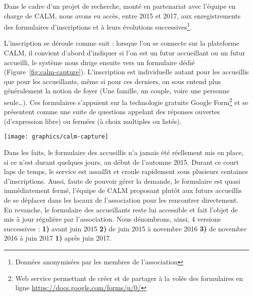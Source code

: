 \documentclass[symmetric,justified,marginals=raggedouter]{tufte-book}
\begin{document}
\noindent Dans le cadre d'un projet de recherche, monté en partenariat avec l'équipe en charge de CALM, nous avons eu accès, entre 2015 et 2017, aux enregistrements des formulaires d'inscriptions et à leurs évolutions successives\footnote{\RaggedOuter Données anonymisées par les membres de l'association}. 

L'inscription se déroule comme suit : lorsque l'on se connecte sur la plateforme CALM, il convient d'abord d'indiquer si l'on est un futur accueillant ou un futur accueilli, le système nous dirige ensuite vers un formulaire dédié (Figure~\ref{fig:calm-capture}). L'inscription est individuelle autant pour les accueillis que pour les accueillants, même si pour ces derniers, on sous entend plus généralement la notion de foyer (Une famille, un  couple, voire une personne seule\ldots{}). Ces formulaires s'appuient sur la technologie gratuite Google Form\footnote{\RaggedOuter Web service permettant de créer et de partager à la volée des formulaires en ligne \url{https://docs.google.com/forms/u/0/}} et se présentent comme une suite de questions appelant des réponses ouvertes (d'expression libre) ou fermées (à choix multiples ou listés).

\begin{figure*}
  \texttt{[image: graphics/calm-capture]}
  \caption{Premières questions du formulaire accueillants}
  \label{fig:calm-capture}
\end{figure*}

\noindent Dans les faits, le formulaire des accueillis n'a jamais été réellement mis en place, si ce n'est durant quelques jours, au début de l'automne 2015. Durant ce court laps de temps, le service est assaillit et croule rapidement sous plusieurs centaines d'inscriptions. Aussi, faute de pouvoir gérer la demande, le formulaire est quasi immédiatement fermé, l'équipe de CALM proposant plutôt aux futurs accueillis de se déplacer dans les locaux de l'association pour les rencontrer directement. En revanche, le formulaire des accueillants reste lui accessible et fait l'objet de mis à jour régulière par l'association. Nous dénombrons, ainsi, 4 versions successives : \textbf{1)} avant juin 2015 \textbf{2)} de juin 2015 à novembre 2016 \textbf{3)} de novembre 2016 à juin 2017 \textbf{1)} après juin 2017.       
\end{document}
